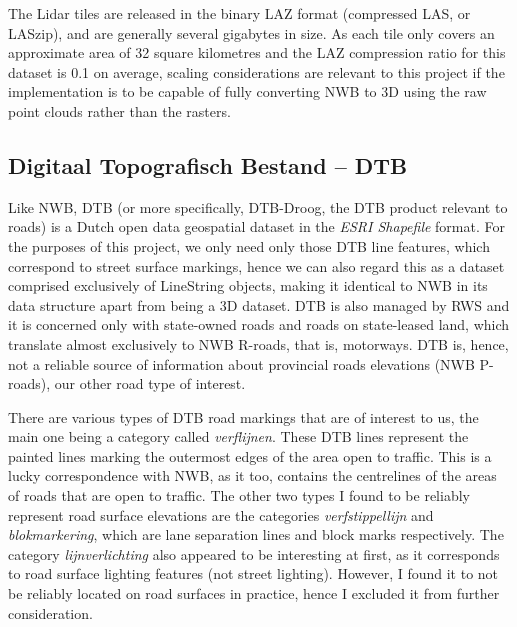 The Lidar tiles are released in the binary LAZ format (compressed LAS, or LASzip), and are generally several gigabytes in size. As each tile only covers an approximate area of 32 square kilometres and the LAZ compression ratio for this dataset is 0.1 on average, scaling considerations are relevant to this project if the implementation is to be capable of fully converting NWB to 3D using the raw point clouds rather than the rasters.

\subsection{Digitaal Topografisch Bestand – DTB}
\label{sub:dtb}

Like NWB, DTB (or more specifically, DTB-Droog, the DTB product relevant to roads) is a Dutch open data geospatial dataset in the \textit{ESRI Shapefile} format. For the purposes of this project, we only need only those DTB line features, which correspond to street surface markings, hence we can also regard this as a dataset comprised exclusively of LineString objects, making it identical to NWB in its data structure apart from being a 3D dataset. DTB is also managed by RWS and it is concerned only with state-owned roads and roads on state-leased land, which translate almost exclusively to NWB R-roads, that is, motorways. DTB is, hence, not a reliable source of information about provincial roads elevations (NWB P-roads), our other road type of interest.

There are various types of DTB road markings that are of interest to us, the main one being a category called \textit{verflijnen}. These DTB lines represent the painted lines marking the outermost edges of the area open to traffic. This is a lucky correspondence with NWB, as it too, contains the centrelines of the areas of roads that are open to traffic. The other two types I found to be reliably represent road surface elevations are the categories \textit{verfstippellijn} and \textit{blokmarkering}, which are lane separation lines and block marks respectively. The category \textit{lijnverlichting} also appeared to be interesting at first, as it corresponds to road surface lighting features (not street lighting). However, I found it to not be reliably located on road surfaces in practice, hence I excluded it from further consideration.

